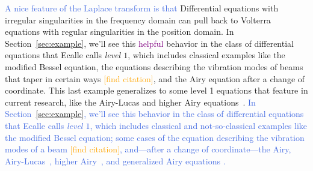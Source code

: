 \documentclass{article}
\theoremstyle{plain}
\begin{document}
\textcolor{RoyalBlue}{A nice feature of the Laplace transform is that} Differential equations with irregular singularities in the frequency domain can pull back to Volterra equations with regular singularities in the position domain. In Section~\ref{sec:example}, we'll see this \textcolor{purple}{helpful} behavior in the class of differential equations that Ecalle calls {\em level $1$}, which includes classical examples like the modified Bessel equation, the equations describing the vibration modes of beams that taper in certain ways \textcolor{orange}{[find citation]}, and the Airy equation after a change of coordinate. This last example generalizes to some level 1 equations that feature in current research, like the Airy-Lucas and higher Airy equations~\cite[Equations 3.2 and 3.8]{charbonnier22}\cite{durugo_higher}. \textcolor{RoyalBlue}{In Section~\ref{sec:example}, we'll see this behavior in the class of differential equations that Ecalle calls {\em level $1$}, which includes classical and not-so-classical examples like the modified Bessel equation; some cases of the equation describing the vibration modes of a beam \textcolor{orange}{[find citation]}, and---after a change of coordinate---the Airy, Airy-Lucas~\cite[Equation 3.2]{charbonnier22}, higher Airy~\cite[Equation 3.8]{charbonnier22}\cite{durugo_higher}, and generalized Airy equations \cite[Equation 9.13.31]{dlmf}.}
\end{document}
